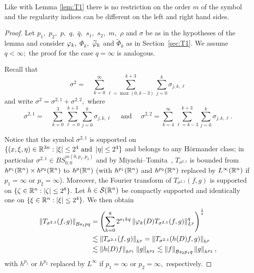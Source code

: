 Like with Lemma \ref{lem:T1} there is no restriction on the order $m$ of the symbol and the regularity indices can be different on the left and right hand sides.


\begin{proof}   Let $p_1,$ $p_2,$ $p,$ $q,$ $\bar{q},$ $s_1,$ $s_2,$ $m,$ $\rho$ and $\sigma$ be as in the hypotheses of the lemma and consider $\varphi_k,$ $\Phi_k,$ $\widetilde{\varphi}_k$ and $\widetilde{\Phi}_k$ as in Section~\ref{sec:T1}. We assume $q<\infty;$ the proof for the case $q=\infty$ is analogous.

Recall that
\[
\sigma^2= \quad \sum\limits_{k=0}^\infty  \sum\limits_{\ell =\max(0,k-3)}^{k+3} \sum\limits_{j=0}^k \sigma_{j,k,\ell}
\]
and write $\sigma^2=\sigma^{2,1}+\sigma^{2,2},$ where 
\[
\sigma^{2,1}= \quad \sum\limits_{k=0}^{3}  \sum\limits_{\ell =0}^{k+3} \sum\limits_{j=0}^k \sigma_{j,k,\ell}  
\quad \text{ and }\quad  \sigma^{2,2}= \sum\limits_{k=4}^\infty  \sum\limits_{\ell =k-3}^{k+3} \sum\limits_{j=0}^k \sigma_{j,k,\ell}.
\]

Notice that the symbol $\sigma^{2,1}$ is supported on $\{(x,\xi,\eta)\in\mathbb{R}^{3n}: \left\vert \xi \right\vert\le 2^{4} \text{ and } \left\vert \eta \right\vert\le2^{4}\}$ and belongs to any H\"ormander class; in particular $\sigma^{2,1}\in BS^{m(0,p_1,p_2)}_{0,0}$ and by Miyachi--Tomita~\cite[Theorem 1.1]{MR3179688}, $T_{\sigma^{2,1}}$ is bounded from $h^{p_1}({{\mathbb R}^n})\times h^{p_2}({{\mathbb R}^n})$ to $h^{p}({{\mathbb R}^n})$ (with $h^{p_1}({{\mathbb R}^n})$ and $h^{p_2}({{\mathbb R}^n})$ replaced by $L^\infty({{\mathbb R}^n})$ if $p_1=\infty$ or $p_2=\infty$). Moreover, the Fourier transform of $T_{\sigma^{2,1}}(f,g)$ is supported on $\{\zeta\in{{\mathbb R}^n}: \left\vert \zeta \right\vert\le2^{8}\}.$ Let $h\in{\mathcal{S}}({{\mathbb R}^n})$  be compactly supported and  identically one on $\{\xi\in{{\mathbb R}^n}:\left\vert \xi \right\vert\le 2^{4}\}.$ We then obtain
\begin{align*}
\left\|T_{\sigma^{2,1}}(f,g)\right\|_{\mathcal{B}{s_1}{p}{q}}&=\left(\sum_{k=0}^{8}2^{s_1kq}\left\|\varphi_k(D) T_{\sigma^{2,1}}(f,g)\right\|_{L^p}^q\right)^{\frac{1}{q}}\\&\lesssim \left\|T_{\sigma^{2,1}}(f,g)\right\|_{h^p}=\left\|T_{\sigma^{2,1}}(h(D)f,g)\right\|_{h^p}\\
&\lesssim \left\|h(D)f\right\|_{h^{p_1}}\left\|g\right\|_{h^{p_2}}\lesssim \left\|f\right\|_{\mathcal{B}{s_2}{p_1}{q}}\left\|g\right\|_{h^{p_2}},
\end{align*}
with $h^{p_1}$ or $h^{p_2}$ replaced by $L^\infty$ if $p_1=\infty$ or $p_2=\infty,$ respectively.



\end{proof}
